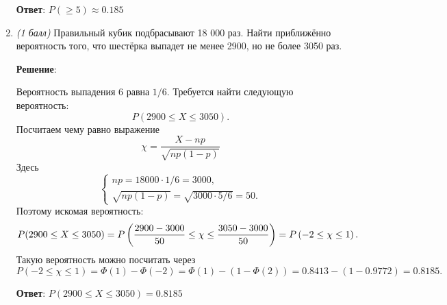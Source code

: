 \documentclass{article}
\begin{document}
\begin{enumerate}
    \textbf{Ответ}:
    $P(\geq 5) \approx 0.185$
    
    \item \textit{(1 балл)} Правильный кубик подбрасывают 18 000 раз. Найти приближённо вероятность того, что шестёрка выпадет не менее 2900, но не более 3050 раз.
    

    \textbf{Решение}:

    Вероятность выпадения 6 равна $1/6$. Требуется найти следующую вероятность:
    \begin{equation}
        P(2900 \leq X \leq 3050).
    \end{equation}
    Посчитаем чему равно выражение
    $$\chi = \frac{X-np}{\sqrt{np(1-p)}}$$
    Здесь
    \begin{equation}
        \begin{cases}
            np = 18000 \cdot 1/6 = 3000,\\
            \sqrt{np(1-p)} = \sqrt{3000\cdot5/6} = 50.
        \end{cases}
    \end{equation}
    Поэтому искомая вероятность:
    \begin{equation}
        P(2900 \leq X \leq 3050) = P\left(\frac{2900 - 3000}{50} \leq \chi \leq \frac{3050 - 3000}{50}\right) = \\
        P\left(-2 \leq \chi \leq 1\right).
    \end{equation}
    Такую вероятность можно посчитать через
    \begin{equation}
        P\left(-2 \leq \chi \leq 1\right) = \Phi(1) - \Phi(-2) = \Phi(1) - (1 - \Phi(2)) = 0.8413 - (1 - 0.9772) = 0.8185.
    \end{equation}

    \textbf{Ответ}:
    $P(2900 \leq X \leq 3050) = 0.8185$
    
    
\end{enumerate}

  
\end{document}
